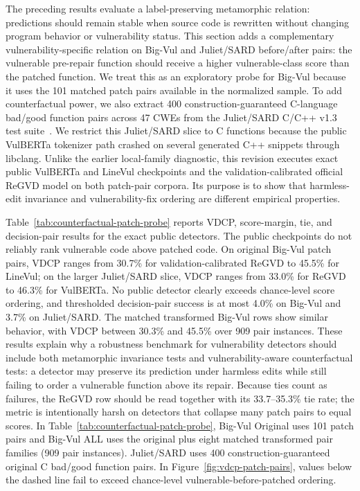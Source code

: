 \documentclass[a4paper,fleqn]{cas-dc}
\begin{document}
The preceding results evaluate a label-preserving metamorphic relation:
predictions should remain stable when source code is rewritten without changing
program behavior or vulnerability status. This section adds a complementary
vulnerability-specific relation on Big-Vul and Juliet/SARD before/after pairs: the
vulnerable pre-repair function should receive a higher vulnerable-class score than
the patched function. We treat this as an exploratory probe for Big-Vul because
it uses the 101 matched patch pairs available in the normalized sample. To add
counterfactual power, we also extract 400 construction-guaranteed C-language
bad/good function pairs across 47 CWEs from the Juliet/SARD C/C++ v1.3 test
suite~\cite{sardJuliet2017}. We restrict this Juliet/SARD slice to C functions
because the public VulBERTa tokenizer path crashed on several generated C++
snippets through libclang. Unlike the earlier local-family diagnostic, this
revision executes exact public VulBERTa and LineVul checkpoints and the
validation-calibrated official ReGVD model on both patch-pair corpora. Its
purpose is to show that harmless-edit invariance and vulnerability-fix ordering
are different empirical properties.

Table~\ref{tab:counterfactual-patch-probe} reports VDCP, score-margin, tie, and
decision-pair results for the exact public detectors. The public checkpoints do
not reliably rank vulnerable code above patched code. On original Big-Vul patch
pairs, VDCP ranges from 30.7\% for validation-calibrated ReGVD to 45.5\% for
LineVul; on the larger Juliet/SARD slice, VDCP ranges from 33.0\% for ReGVD to
46.3\% for VulBERTa. No public detector clearly exceeds chance-level score
ordering, and thresholded decision-pair success is at most 4.0\% on Big-Vul and
3.7\% on Juliet/SARD. The matched transformed Big-Vul rows show similar
behavior, with VDCP between 30.3\% and 45.5\% over 909 pair instances.
These results explain why a robustness benchmark for vulnerability detectors
should include both metamorphic invariance tests and vulnerability-aware
counterfactual tests: a detector may preserve its prediction under harmless
edits while still failing to order a vulnerable function above its repair.
Because ties count as failures, the ReGVD row should be read together with its
33.7--35.3\% tie rate; the metric is intentionally harsh on detectors that
collapse many patch pairs to equal scores.
In Table~\ref{tab:counterfactual-patch-probe}, Big-Vul Original uses 101 patch
pairs and Big-Vul ALL uses the original plus eight matched transformed pair
families (909 pair instances). Juliet/SARD uses 400 construction-guaranteed
original C bad/good function pairs.
In Figure~\ref{fig:vdcp-patch-pairs}, values below the dashed line fail to
exceed chance-level vulnerable-before-patched ordering.
\end{document}
